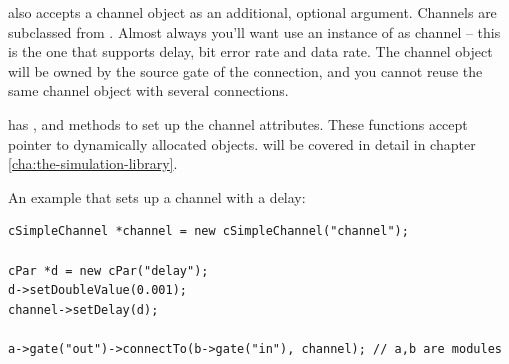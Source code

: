  also accepts a channel object as an
additional, optional argument. Channels are subclassed from
. Almost always you'll want use an instance of
 as channel -- this is the one that supports
delay, bit error rate 
and data rate. The channel object will
be owned by the source gate of the connection, and you cannot
reuse the same channel object with several connections.

 has , 
and  methods to set up the channel attributes.
These functions accept pointer to dynamically allocated
 objects.  will be covered in detail
in chapter \ref{cha:the-simulation-library}.

An example that sets up a channel with a delay:

\begin{verbatim}
cSimpleChannel *channel = new cSimpleChannel("channel");

cPar *d = new cPar("delay");
d->setDoubleValue(0.001);
channel->setDelay(d);

a->gate("out")->connectTo(b->gate("in"), channel); // a,b are modules
\end{verbatim}




